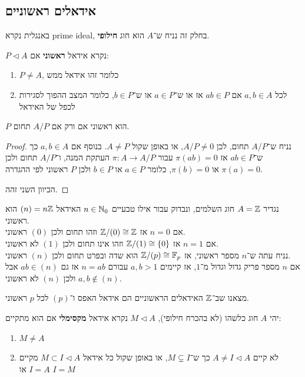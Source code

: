 \subsection{אידאלים ראשוניים}
באנגלית נקרא prime ideal, בחלק זה נניח ש־$A$ הוא חוג \textbf{חילופי}.

\begin{definition}
	$P \triangleleft A$ נקרא אידאל \textbf{ראשוני} אם:
	\begin{enumerate}
		\item $P \ne A$, כלומר זהו אידאל ממש
		\item לכל $a, b \in A$ אם $a b \in P$ אז או ש־$a \in P$ או ש־$b \in P$, כלומר המצב ההפוך לסגירות לכפל של האידאל
	\end{enumerate}
\end{definition}
\begin{proposition}
	$P$ הוא ראשוני אם ורק אם $A / P$ תחום.
\end{proposition}
\begin{proof}
	נניח ש־$A / P$ תחום, לכן $A / P \ne 0$, או באופן שקול $A \ne P$.
	בנוסף אם $a, b \in A$ כך ש־$a b \in P$ אז $\pi(a b) = 0$ עבור $\pi : A \to A / P$ העתקת המנה, ו־$A / P$ תחום ולכן $\pi(a) = 0$ או $\pi(b) = 0$,
	כלומר $a \in P$ או $b \in P$ ולכן $P$ ראשוני לפי ההגדרה.

	הכיוון השני זהה.
\end{proof}
\begin{example}
	נגדיר $A = \mathbb{Z}$ חוג השלמים, ונבדוק עבור אילו טבעיים $n \in \mathbb{N}_0$ האידאל $(n) = n \mathbb{Z}$ הוא ראשוני. \\
	אם $n = 0$ אז $\mathbb{Z} / (0) \cong \mathbb{Z}$ וזהו תחום ולכן $(0)$ ראשוני. \\
	אם $n = 1$ אז $\mathbb{Z} / (1) \cong \{ 0 \}$ וזהו אינו תחום ולכן $(1)$ לא ראשוני. \\
	נניח עתה ש־$n$ מספר ראשוני, אז $\mathbb{Z} / (p) \cong \mathbb{F}_p$ הוא שדה ובפרט תחום ולכן $(n)$ ראשוני. \\
	אם $n$ מספר פריק גדול וגדול מ־$1$, אז קיימים $a, b > 1$ עבורם $n = a b$ אז גם $a b \in (n)$ אבל $a, b \notin (n)$ ולכן $(n)$ לא ראשוני.

	מצאנו שב־$\mathbb{Z}$ האידאלים הראשוניים הם אידאל האפס ו־$(p)$ לכל $p$ ראשוני.
\end{example}
\begin{definition}
	יהי $A$ חוג כלשהו (לא בהכרח חילופי), $M \triangleleft A$ נקרא אידאל \textbf{מקסימלי} אם הוא מתקיים:
	\begin{enumerate}
		\item $M \ne A$
		\item לא קיים $A \ne I \triangleleft A$ כך ש־$M \subsetneq I$, או באופן שקול כל אידאל $M \subset I \triangleleft A$ מקיים $I = A$ או $I = M$
	\end{enumerate}
\end{definition}
